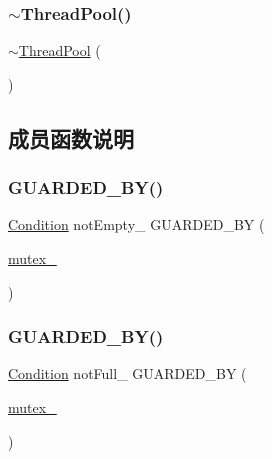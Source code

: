 \subsubsection{\texorpdfstring{$\sim$\+Thread\+Pool()}{~ThreadPool()}}
{\footnotesize\ttfamily $\sim$\hyperlink{classmuduo_1_1ThreadPool}{Thread\+Pool} (\begin{DoxyParamCaption}{ }\end{DoxyParamCaption})}



\subsection{成员函数说明}
\mbox{\label{classmuduo_1_1ThreadPool_adc809585805fc6f065fa7414c29ab2af}} 
\subsubsection{\texorpdfstring{G\+U\+A\+R\+D\+E\+D\+\_\+\+B\+Y()}{GUARDED\_BY()}\hspace{0.1cm}{\footnotesize\ttfamily [1/3]}}
{\footnotesize\ttfamily \hyperlink{classmuduo_1_1Condition}{Condition} not\+Empty\+\_\+ G\+U\+A\+R\+D\+E\+D\+\_\+\+BY (\begin{DoxyParamCaption}\item[{\hyperlink{classmuduo_1_1ThreadPool_a6e1bf1809a42f40f1a21178dc6620a6f}{mutex\+\_\+}}]{ }\end{DoxyParamCaption})\hspace{0.3cm}{\ttfamily [private]}}

\mbox{\label{classmuduo_1_1ThreadPool_aa1da415b15700639c638f90b2cd4850a}} 
\subsubsection{\texorpdfstring{G\+U\+A\+R\+D\+E\+D\+\_\+\+B\+Y()}{GUARDED\_BY()}\hspace{0.1cm}{\footnotesize\ttfamily [2/3]}}
{\footnotesize\ttfamily \hyperlink{classmuduo_1_1Condition}{Condition} not\+Full\+\_\+ G\+U\+A\+R\+D\+E\+D\+\_\+\+BY (\begin{DoxyParamCaption}\item[{\hyperlink{classmuduo_1_1ThreadPool_a6e1bf1809a42f40f1a21178dc6620a6f}{mutex\+\_\+}}]{ }\end{DoxyParamCaption})\hspace{0.3cm}{\ttfamily [private]}}


